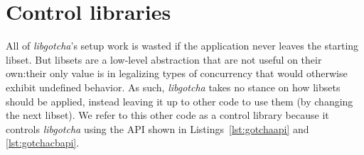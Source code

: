 \section{Control libraries}

All of \textit{libgotcha}'s setup work is wasted if the application never leaves the
starting libset.  But libsets are a low-level abstraction that are not useful on
their own:\@ their only value is in legalizing types of concurrency that would
otherwise exhibit undefined behavior.  As such, \textit{libgotcha} takes no stance on
how libsets should be applied, instead leaving it up to other code to use them (by
changing the next libset).  We refer to this other code as a control library because
it controls \textit{libgotcha} using the API shown in Listings~\ref{lst:gotchaapi}
and \ref{lst:gotchacbapi}.

